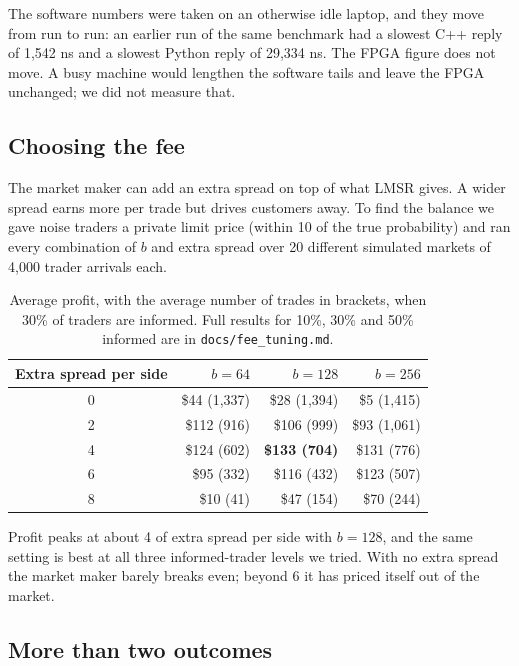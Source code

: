 \documentclass[11pt]{article}
\newcommand{\cent}{\textcent}
\newcommand{\code}[1]{\texttt{#1}}
\begin{document}
The software numbers were taken on an otherwise idle laptop, and they move
from run to run: an earlier run of the same benchmark had a slowest C++ reply
of 1{,}542 ns and a slowest Python reply of 29{,}334 ns. The FPGA figure does
not move. A busy machine
would lengthen the software tails and leave the FPGA unchanged; we did not
measure that.

\subsection{Choosing the fee}

The market maker can add an extra spread on top of what LMSR gives. A wider
spread earns more per trade but drives customers away. To find the balance we
gave noise traders a private limit price (within 10\cent{} of the true
probability) and ran every combination of $b$ and extra spread over 20
different simulated markets of 4{,}000 trader arrivals each.

\begin{table}[h]
\centering
\begin{tabular}{crrr}
\toprule
Extra spread per side & $b = 64$ & $b = 128$ & $b = 256$ \\
\midrule
0\cent & \$44 (1{,}337) & \$28 (1{,}394) & \$5 (1{,}415) \\
2\cent & \$112 (916)    & \$106 (999)    & \$93 (1{,}061) \\
4\cent & \$124 (602)    & \textbf{\$133 (704)} & \$131 (776) \\
6\cent & \$95 (332)     & \$116 (432)    & \$123 (507) \\
8\cent & \$10 (41)      & \$47 (154)     & \$70 (244) \\
\bottomrule
\end{tabular}
\caption{Average profit, with the average number of trades in brackets, when
30\% of traders are informed. Full results for 10\%, 30\% and 50\% informed
are in \code{docs/fee\_tuning.md}.}
\end{table}

Profit peaks at about 4\cent{} of extra spread per side with $b = 128$, and
the same setting is best at all three informed-trader levels we tried. With no
extra spread the market maker barely breaks even; beyond 6\cent{} it has
priced itself out of the market.

\subsection{More than two outcomes}
\end{document}
